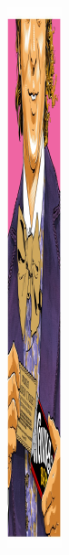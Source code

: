\documentclass[12pt, a4paper]{article}
\begin{document}
\begin{figure}[h!]
\begin{minipage}[h!]{0.3\linewidth}
\includegraphics[width=0.8\linewidth, height=0.21\textheight]{pop7.pdf}

\end{minipage}
\end{figure}
\end{document}
